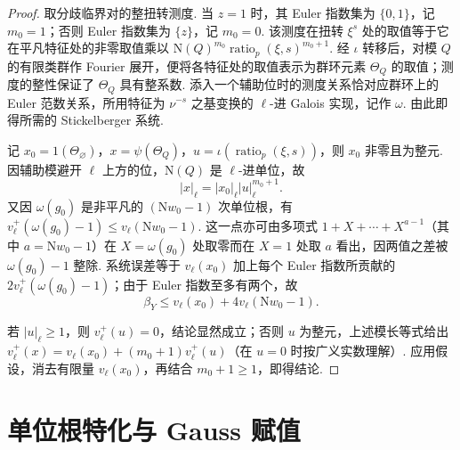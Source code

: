 \begin{proof}
取分歧临界对的整扭转测度. 当 $z=1$ 时，其 Euler 指数集为 $\{0,1\}$，记 $m_0=1$；否则 Euler 指数集为 $\{z\}$，记 $m_0=0$. 该测度在扭转 $\xi^s$ 处的取值等于它在平凡特征处的非零取值乘以 $\mathrm N(Q)^{m_0}\operatorname{ratio}_p(\xi,s)^{m_0+1}$.
经 $\iota$ 转移后，对模 $Q$ 的有限类群作 Fourier 展开，便将各特征处的取值表示为群环元素 $\Theta_Q$ 的取值；测度的整性保证了 $\Theta_Q$ 具有整系数. 添入一个辅助位时的测度关系恰对应群环上的 Euler 范数关系，所用特征为 $\nu^{-s}$ 之基变换的 $\ell$-进 Galois 实现，记作 $\omega$. 由此即得所需的 Stickelberger 系统.

记 $x_0=1(\Theta_\varnothing)$，$x=\psi(\Theta_Q)$，$u=\iota(\operatorname{ratio}_p(\xi,s))$，则 $x_0$ 非零且为整元. 因辅助模避开 $\ell$ 上方的位，$\mathrm N(Q)$ 是 $\ell$-进单位，故
\[
 |x|_\ell=|x_0|_\ell |u|_\ell^{m_0+1}.
\]
又因 $\omega(g_0)$ 是非平凡的 $(\mathrm Nw_0-1)$ 次单位根，有 $v_\ell^+(\omega(g_0)-1)\le v_\ell(\mathrm Nw_0-1)$. 这一点亦可由多项式 $1+X+\cdots+X^{a-1}$（其中 $a=\mathrm Nw_0-1$）在 $X=\omega(g_0)$ 处取零而在 $X=1$ 处取 $a$ 看出，因两值之差被 $\omega(g_0)-1$ 整除. 系统误差等于 $v_\ell(x_0)$ 加上每个 Euler 指数所贡献的 $2v_\ell^+(\omega(g_0)-1)$；由于 Euler 指数至多有两个，故
\[
 \beta_Y\le v_\ell(x_0)+4v_\ell(\mathrm Nw_0-1).
\]

若 $|u|_\ell\ge1$，则 $v_\ell^+(u)=0$，结论显然成立；否则 $u$ 为整元，上述模长等式给出 $v_\ell^+(x)=v_\ell(x_0)+(m_0+1)v_\ell^+(u)$（在 $u=0$ 时按广义实数理解）. 应用假设，消去有限量 $v_\ell(x_0)$，再结合 $m_0+1\ge1$，即得结论.
\end{proof}

\section{单位根特化与 Gauss 赋值}
\label{sec:c-gauss-valuation}

